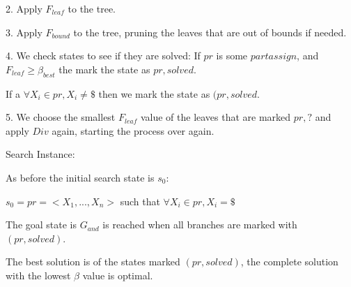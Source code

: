 \documentclass[10pt]{article}
\begin{document}
2. Apply $F_{leaf}$ to the tree. 

3. Apply $F_{bound}$ to the tree, pruning the leaves that are out of bounds if needed.

4. We check states to see if they are solved: If $pr$ is some $partassign$, and $F_{leaf} \geq \beta_{best} $ the mark the state as $pr, solved$.

If a $\forall X_i \in pr, X_i \neq \$ $ then we mark the state as $(pr, solved$. 

5. We choose the smallest $F_{leaf}$ value of the leaves that are marked $pr, ?$  and apply $Div$ again, starting the process over again.

\bigskip
\bigskip
\bigskip
\bigskip
 
Search Instance:

As before the initial search state is $s_0$:

\bigskip

$s_0 = pr = <X_1, ..., X_n> $ such that $\forall X_i \in pr, X_i = \$ $ 

\bigskip

The goal state is $G_{and}$ is reached when all branches are marked with $(pr, solved)$.

\bigskip

The best solution is of the states marked $(pr, solved)$, the complete solution with the lowest $\beta$ value is optimal.
\huge




 
\end{document}
